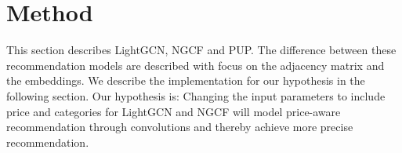 \section{Method}\label{sec:method}
This section describes LightGCN, NGCF and PUP.
The difference between these recommendation models are described with focus on the adjacency matrix and the embeddings.
We describe the implementation for our hypothesis in the following section.
Our hypothesis is: Changing the input parameters to include price and categories for LightGCN and NGCF will model price-aware recommendation through convolutions and thereby achieve more precise recommendation.





